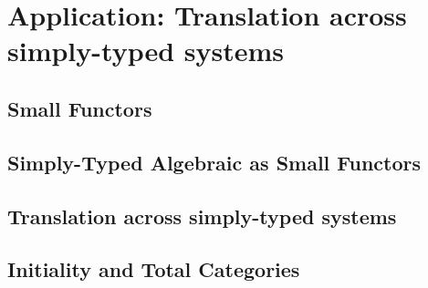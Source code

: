 \section{Application: Translation across simply-typed systems}

\subsection{Small Functors}
\lipsum[1]

\subsection{Simply-Typed Algebraic as Small Functors}
\lipsum[1]

\subsection{Translation across simply-typed systems}
\lipsum[1]

\subsection{Initiality and Total Categories}
\lipsum[1]
